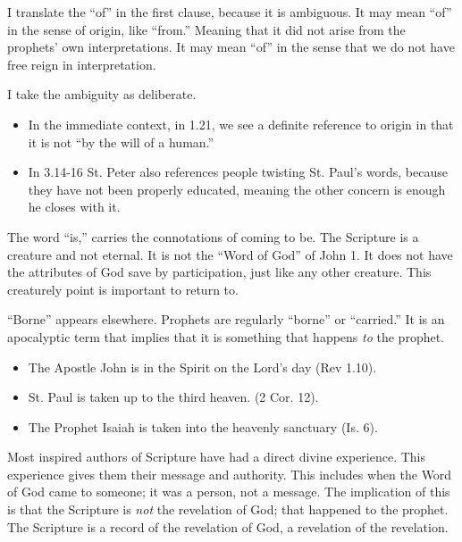 \documentclass{beamer}
\begin{document}
\begin{frame}
  I translate the ``of'' in the first clause, because it is ambiguous.
  It may mean ``of'' in the sense of origin, like ``from.''
  Meaning that it did not arise from the prophets' own interpretations.
  It may mean ``of'' in the sense that we do not have free reign in interpretation.
\end{frame}

\begin{frame}
  I take the ambiguity as deliberate.\pause
  \begin{itemize}
	\item In the immediate context, in 1.21, we see a definite reference to origin in that it is not ``by the will of a human.''\pause
	\item In 3.14-16 St. Peter also references people twisting St. Paul's words, because they have not been properly educated, meaning the other concern is enough he closes with it.
  \end{itemize}
\end{frame}

\begin{frame}
  The word ``is,'' carries the connotations of coming to be.
  The Scripture is a creature and not eternal.
  It is not the ``Word of God'' of John 1.
  It does not have the attributes of God save by participation, just like any other creature.
  This creaturely point is important to return to.
\end{frame}

\begin{frame}
  ``Borne'' appears elsewhere.
  Prophets are regularly ``borne'' or ``carried.''
  It is an apocalyptic term that implies that it is something that happens \emph{to} the prophet.\pause
  \begin{itemize}
	\item The Apostle John is in the Spirit on the Lord's day (Rev 1.10).\pause
	\item St. Paul is taken up to the third heaven. (2 Cor. 12).\pause
	\item The Prophet Isaiah is taken into the heavenly sanctuary (Is. 6).
  \end{itemize}
\end{frame}

\begin{frame}
  Most inspired authors of Scripture have had a direct divine experience.
  This experience gives them their message and authority.
  This includes when the Word of God came to someone; it was a person, not a message.
  The implication of this is that the Scripture is \emph{not} the revelation of God; that happened to the prophet.
  The Scripture is a record of the revelation of God, a revelation of the revelation.
\end{frame}
\end{document}
